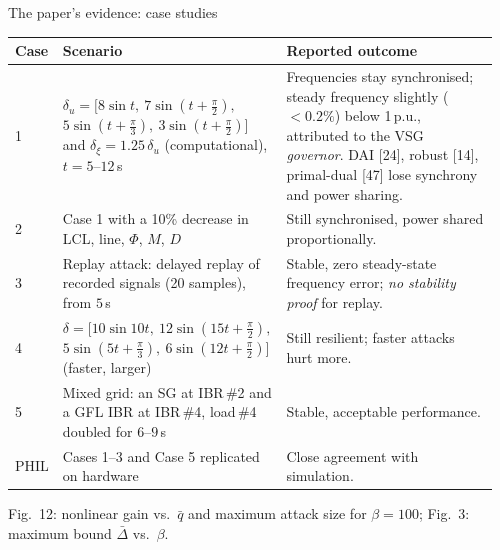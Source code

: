 \documentclass[aspectratio=169,9pt]{beamer}
\begin{document}
\begin{frame}[t]{The paper's evidence: case studies}
\footnotesize
\begin{center}
\scriptsize
\begin{tabular}{@{}p{0.06\linewidth}p{0.40\linewidth}p{0.50\linewidth}@{}}
\toprule
\textbf{Case} & \textbf{Scenario} & \textbf{Reported outcome}\\
\midrule
1 & $\delta_u=[8\sin t,\ 7\sin(t{+}\tfrac\pi2),$ $5\sin(t{+}\tfrac\pi3),\ 3\sin(t{+}\tfrac\pi2)]$ and $\delta_\xi=1.25\,\delta_u$ (computational), $t=5$--$12$\,s & Frequencies stay synchronised; steady frequency slightly ($<0.2\%$) below 1\,p.u., attributed to the VSG \emph{governor}. DAI [24], robust [14], primal-dual [47] lose synchrony and power sharing. \\
2 & Case 1 with a 10\% decrease in LCL, line, $\Phi$, $M$, $D$ & Still synchronised, power shared proportionally. \\
3 & Replay attack: delayed replay of recorded signals (20 samples), from $5$\,s & Stable, zero steady-state frequency error; \emph{no stability proof} for replay. \\
4 & $\delta=[10\sin10t,\ 12\sin(15t{+}\tfrac\pi2),$ $5\sin(5t{+}\tfrac\pi3),\ 6\sin(12t{+}\tfrac\pi2)]$ (faster, larger) & Still resilient; faster attacks hurt more. \\
5 & Mixed grid: an SG at IBR\,\#2 and a GFL IBR at IBR\,\#4, load\,\#4 doubled for $6$--$9$\,s & Stable, acceptable performance. \\
\midrule
PHIL & Cases 1--3 and Case 5 replicated on hardware & Close agreement with simulation. \\
\bottomrule
\end{tabular}
\end{center}
{\scriptsize Fig.~12: nonlinear gain vs.\ $\bar q$ and maximum attack size for $\beta=100$; Fig.~3: maximum bound $\bar\Delta$ vs.\ $\beta$.}
\end{frame}
\end{document}
